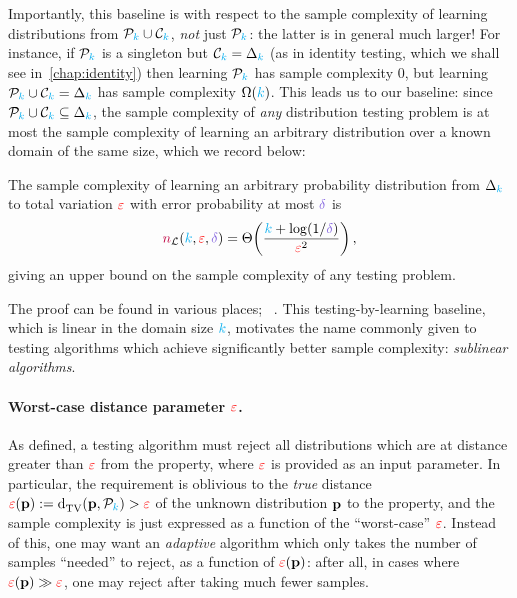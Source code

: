 Importantly, this baseline is with respect to the sample complexity of learning distributions from $\mathcal{P}_{\textcolor{cyan}{k}}\cup\mathcal{C}_{\textcolor{cyan}{k}}$, \emph{not} just $\mathcal{P}_{\textcolor{cyan}{k}}$: the latter is in general much larger! For instance, if $\mathcal{P}_{\textcolor{cyan}{k}}$ is a singleton but $\mathcal{C}_{\textcolor{cyan}{k}}=\Delta_{{\textcolor{cyan}{k}}}$ (\eg as in identity testing, which we shall see in~\cref{chap:identity}) then learning $\mathcal{P}_{\textcolor{cyan}{k}}$ has sample complexity $0$, but learning $\mathcal{P}_{\textcolor{cyan}{k}}\cup\mathcal{C}_{\textcolor{cyan}{k}}=\Delta_{{\textcolor{cyan}{k}}}$ has sample complexity $\Omega({\textcolor{cyan}{k}})$. This leads us to our baseline: since $\mathcal{P}_{\textcolor{cyan}{k}}\cup\mathcal{C}_{\textcolor{cyan}{k}}\subseteq \Delta_{{\textcolor{cyan}{k}}}$, the sample complexity of \emph{any} distribution testing problem is at most the sample complexity of learning an arbitrary distribution over a known domain of the same size, which we record below:
\begin{theorem}
  \label{theo:learningbaseline}
  The sample complexity of learning an arbitrary probability distribution from $\Delta_{{\textcolor{cyan}{k}}}$ to total variation $\textcolor{red}{\varepsilon}$ with error probability at most $\errprob$ is
  \[
      \ns_{\mathcal{L}}(\ab,\dst,\errprob) = \bigTheta{\frac{\ab+\log(1/\errprob)}{\dst^2}}\,,
  \]
  giving an upper bound on the sample complexity of any testing problem.
\end{theorem}
The proof can be found in various places; \eg~\citet{KOPS:15,Canonne20:learning:short}. This testing-by-learning baseline, which is linear in the domain size ${\textcolor{cyan}{k}}$, motivates the name commonly given to testing algorithms which achieve significantly better sample complexity: \emph{sublinear algorithms}.

\paragraph{Worst-case distance parameter $\textcolor{red}{\varepsilon}$.} \label{chap:what:adaptive}
As defined, a testing algorithm must reject all distributions which are at distance greater than $\textcolor{red}{\varepsilon}$ from the property, where $\textcolor{red}{\varepsilon}$ is provided as an input parameter. In particular, the requirement is oblivious to the \emph{true} distance $\dst(\p) \eqdef \totalvardist{\p}{\property_\ab} > \dst$ of the unknown distribution $\mathbf{p}$ to the property, and the sample complexity is just expressed as a function of the ``worst-case'' $\textcolor{red}{\varepsilon}$. Instead of this, one may want an \emph{adaptive} algorithm which only takes the number of samples ``needed'' to reject, as a function of $\textcolor{red}{\varepsilon}(\mathbf{p})$: after all, in cases where $\textcolor{red}{\varepsilon}(\mathbf{p}) \gg \textcolor{red}{\varepsilon}$, one may reject after taking much fewer samples.

